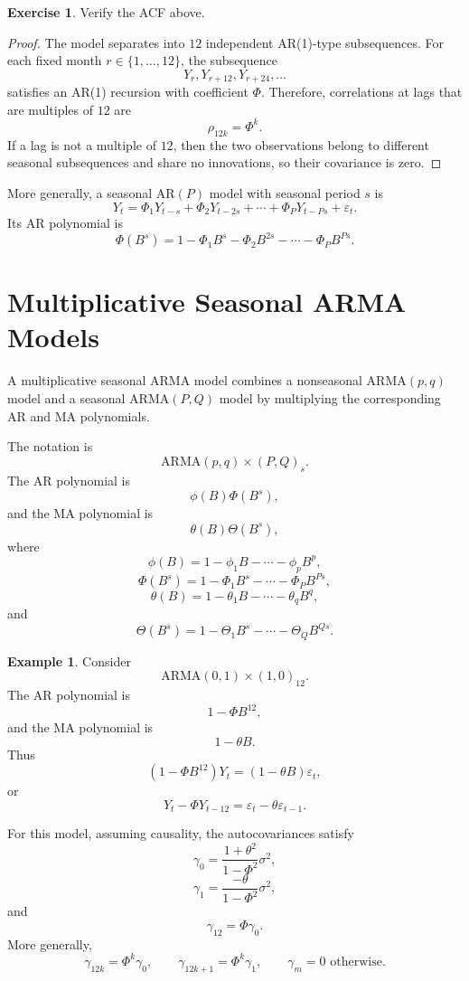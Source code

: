 \documentclass[12pt,oneside]{book}
\numberwithin{equation}{section}
\theoremstyle{definition}
\newtheorem{example}{Example}[section]
\newtheorem{exercise}{Exercise}[section]
\theoremstyle{plain}
\theoremstyle{remark}
\begin{document}
\begin{exercise}
Verify the ACF above.
\end{exercise}

\begin{proof}
The model separates into $12$ independent AR(1)-type subsequences. For each fixed month $r\in\{1,\ldots,12\}$, the subsequence
\[
Y_r,Y_{r+12},Y_{r+24},\ldots
\]
satisfies an AR(1) recursion with coefficient $\Phi$. Therefore, correlations at lags that are multiples of $12$ are
\[
\rho_{12k}=\Phi^k.
\]
If a lag is not a multiple of $12$, then the two observations belong to different seasonal subsequences and share no innovations, so their covariance is zero.
\end{proof}

More generally, a seasonal AR$(P)$ model with seasonal period $s$ is
\[
Y_t=\Phi_1Y_{t-s}+\Phi_2Y_{t-2s}+\cdots+\Phi_PY_{t-Ps}+\varepsilon_t.
\]
Its AR polynomial is
\[
\Phi(B^s)
=
1-\Phi_1B^s-\Phi_2B^{2s}-\cdots-\Phi_PB^{Ps}.
\]

\section{Multiplicative Seasonal ARMA Models}

A multiplicative seasonal ARMA model combines a nonseasonal ARMA$(p,q)$ model and a seasonal ARMA$(P,Q)$ model by multiplying the corresponding AR and MA polynomials.

The notation is
\[
\mathrm{ARMA}(p,q)\times(P,Q)_s.
\]
The AR polynomial is
\[
\phi(B)\Phi(B^s),
\]
and the MA polynomial is
\[
\theta(B)\Theta(B^s),
\]
where
\[
\phi(B)
=
1-\phi_1B-\cdots-\phi_pB^p,
\]
\[
\Phi(B^s)
=
1-\Phi_1B^s-\cdots-\Phi_PB^{Ps},
\]
\[
\theta(B)
=
1-\theta_1B-\cdots-\theta_qB^q,
\]
and
\[
\Theta(B^s)
=
1-\Theta_1B^s-\cdots-\Theta_QB^{Qs}.
\]

\begin{example}
Consider
\[
\mathrm{ARMA}(0,1)\times(1,0)_{12}.
\]
The AR polynomial is
\[
1-\Phi B^{12},
\]
and the MA polynomial is
\[
1-\theta B.
\]
Thus
\[
(1-\Phi B^{12})Y_t=(1-\theta B)\varepsilon_t,
\]
or
\[
Y_t-\Phi Y_{t-12}
=
\varepsilon_t-\theta\varepsilon_{t-1}.
\]
\end{example}

For this model, assuming causality, the autocovariances satisfy
\[
\gamma_0
=
\frac{1+\theta^2}{1-\Phi^2}\sigma^2,
\]
\[
\gamma_1
=
\frac{-\theta}{1-\Phi^2}\sigma^2,
\]
and
\[
\gamma_{12}
=
\Phi\gamma_0.
\]
More generally,
\[
\gamma_{12k}
=
\Phi^k\gamma_0,
\qquad
\gamma_{12k+1}
=
\Phi^k\gamma_1,
\qquad
\gamma_m=0
\text{ otherwise}.
\]
\end{document}
